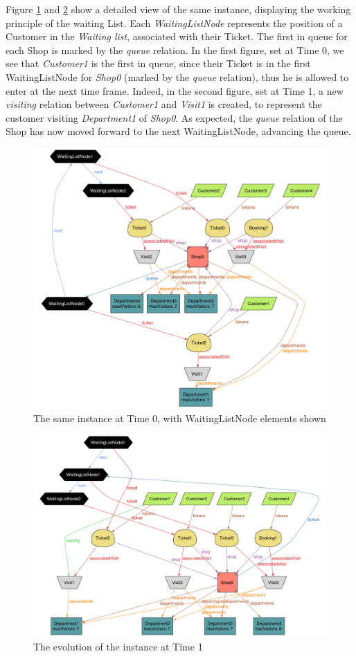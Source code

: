 \pagebreak
Figure \ref{fig:waitinglistnode1} and \ref{fig:waitinglistnode2} show a detailed view of the same instance, displaying the working principle of the waiting List. Each \emph{WaitingListNode} represents the position of a Customer in the \emph{Waiting list}, associated with their Ticket. The first in queue for each Shop is marked by the \emph{queue} relation. In the first figure, set at Time 0, we see that \emph{Customer1} is the first in queue, since their Ticket is in the first WaitingListNode for \emph{Shop0} (marked by the \emph{queue} relation), thus he is allowed to enter at the next time frame.
Indeed, in the second figure, set at Time 1, a new \emph{visiting} relation between \emph{Customer1} and \emph{Visit1} is created, to represent the customer visiting \emph{Department1} of \emph{Shop0}. As expected, the \emph{queue} relation of the Shop has now moved forward to the next WaitingListNode, advancing the queue.
\begin{figure}[H]
    \centering
    \includegraphics[width=\textwidth]{Images/Alloy/5Customers_v1_t0_detail_crop.png}
    \caption{The same instance at Time 0, with WaitingListNode elements shown}
    \label{fig:waitinglistnode1}
\end{figure}
\begin{figure}[H]
    \centering
    \includegraphics[width=\textwidth]{Images/Alloy/5Customers_v1_t1_detail_crop.png}
    \caption{The evolution of the instance at Time 1}
    \label{fig:waitinglistnode2}
\end{figure}